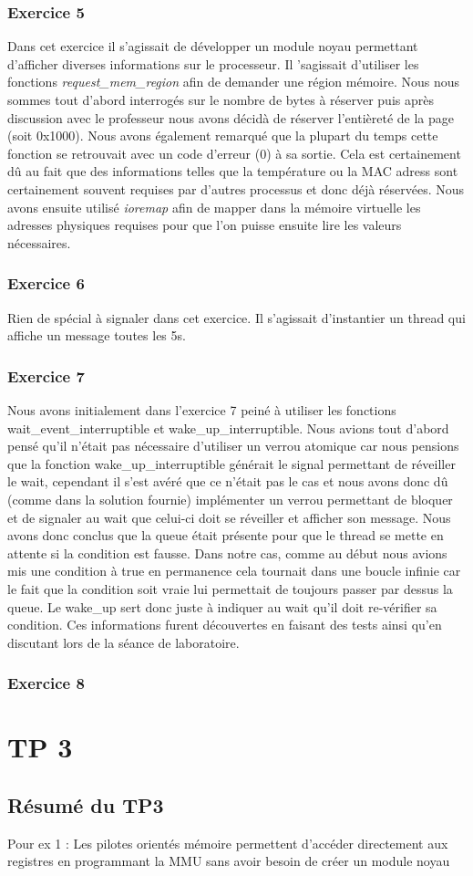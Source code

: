 \documentclass{ReportTemplate}
\begin{document}
\subsection{Exercice 5}
Dans cet exercice il s'agissait de développer un module noyau permettant
d'afficher diverses informations sur le processeur. Il 'sagissait d'utiliser les
fonctions \textit{request\_mem\_region} afin de demander une région mémoire.
Nous nous sommes tout d'abord interrogés sur le nombre de bytes à réserver puis
après discussion avec le professeur nous avons décidà de réserver l'entièreté de
la page (soit 0x1000). Nous avons également remarqué que la plupart du temps
cette fonction se retrouvait avec un code d'erreur (0) à sa sortie. Cela est
certainement dû au fait que des informations telles que la température ou la MAC
adress sont certainement souvent requises par d'autres processus et donc déjà
réservées. Nous avons ensuite utilisé \textit{ioremap} afin de mapper dans la
mémoire virtuelle les adresses physiques requises pour que l'on puisse ensuite
lire les valeurs nécessaires.
\subsection{Exercice 6}
Rien de spécial à signaler dans cet exercice. Il s'agissait d'instantier un
thread qui affiche un message toutes les 5s.
\subsection{Exercice 7}
Nous avons initialement dans l'exercice 7 peiné à utiliser les fonctions
wait\_event\_interruptible et wake\_up\_interruptible. Nous avions tout d'abord
pensé qu'il n'était pas nécessaire d'utiliser un verrou atomique car nous
pensions que la fonction wake\_up\_interruptible générait le signal permettant
de réveiller le wait, cependant il s'est avéré que ce n'était pas le cas et nous
avons donc dû (comme dans la solution fournie) implémenter un verrou permettant
de bloquer et de signaler au wait que celui-ci doit se réveiller et afficher son
message. Nous avons donc conclus que la queue était présente pour que le thread
se mette en attente si la condition est fausse. Dans notre cas, comme au début
nous avions mis une condition à true en permanence cela tournait dans une boucle
infinie car le fait que la condition soit vraie lui permettait de toujours
passer par dessus la queue. Le wake\_up sert donc juste à indiquer au wait qu'il
doit re-vérifier sa condition. Ces informations furent découvertes en faisant
des tests ainsi qu'en discutant lors de la séance de laboratoire.\newline
\newpage
\subsection{Exercice 8}

\chapter{TP 3}
\section{Résumé du TP3}
Pour ex 1 : Les pilotes orientés mémoire permettent d'accéder directement aux
registres en programmant la MMU sans avoir besoin de créer un module noyau
\end{document}
